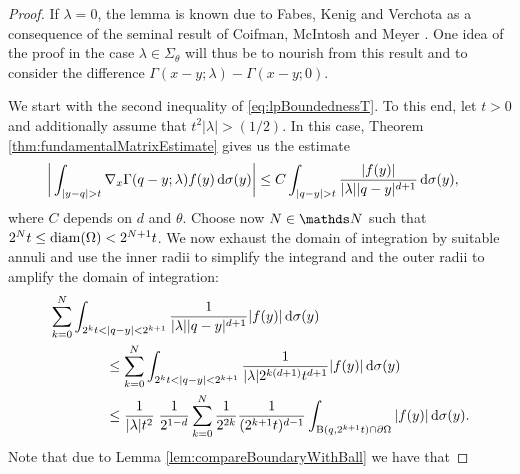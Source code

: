\begin{proof}
  If $\lambda = 0$, the lemma is known due to Fabes, Kenig and Verchota \cite{fabesKenigVerchota} as a consequence of the seminal result of Coifman, McIntosh and Meyer \cite{coifman}.
  One idea of the proof in the case $\lambda \in \Sigma_\theta$ will thus be to nourish from this result and to consider the difference $\Gamma(x - y; \lambda) - \Gamma(x - y; 0)$.

  We start with the second inequality of \eqref{eq:lpBoundednessT}.
  To this end, let $t > 0$ and additionally assume that $t^2 |\lambda| > ({1}/{2})$. 
  In this case, Theorem \ref{thm:fundamentalMatrixEstimate} gives us the estimate
  \begin{align*}
    \bigg| \int_{|y - q| > t} \nabla_x \Gamma(q - y; \lambda) f(y) \, {\operatorname{d}\!{\sigma}}(y) \bigg|
    &\leq C \int_{|q - y| > t} \frac{|f(y)|}{|\lambda| |q - y|^{d + 1}} \, {\operatorname{d}\!{\sigma}}(y) ,
  \end{align*}
  where $C$ depends on $d$ and $\theta$.
  Choose now $N \in \N$ such that $2^N t \leq \operatorname{diam}(\Omega) < 2^{N + 1} t$.
  We now exhaust the domain of integration by suitable annuli and use the inner radii to simplify the integrand and the outer radii to amplify the domain of integration:
  \begin{align}
    &\sum_{k = 0}^N \int_{2^k t < |q - y| < 2^{k + 1}}  \frac{1}{|\lambda| |q - y|^{d + 1}} |f(y)| \, {\operatorname{d}\!{\sigma}}(y) \nonumber\\
    &\qquad\qquad\leq \sum_{k = 0}^N \int_{2^k t < |q - y| < 2^{k + 1}}  \frac{1}{|\lambda| 2^{k(d + 1)}t^{d + 1}} |f(y)| \, {\operatorname{d}\!{\sigma}}(y) \nonumber\\
    &\qquad\qquad\leq \frac{1}{|\lambda|t^2}\; \frac{1}{2^{1 -d}}\sum_{k = 0}^N \frac{1}{2^{2k}} \frac{1}{(2^{k+1} t)^{d - 1}} \int_{\mathrm{B}(q, 2^{k + 1}t) \cap \partial \Omega}  |f(y)| \, {\operatorname{d}\!{\sigma}}(y)\label{eq:gtt}.
  \end{align}
  Note that due to Lemma \ref{lem:compareBoundaryWithBall} we have that

\end{proof}
